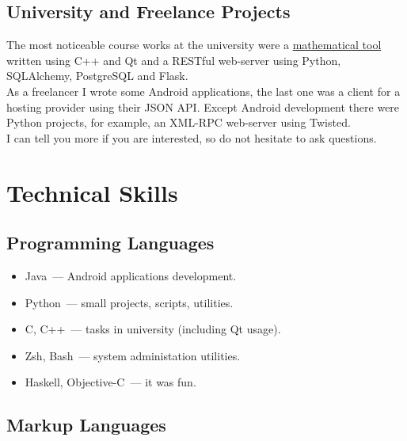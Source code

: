     \subsection*{University and Freelance Projects}

      The most noticeable course works at the university were
      a \href{https://github.com/ming13/aequation}{mathematical tool} written
      using C++ and Qt and a RESTful web-server using Python,
      SQLAlchemy, PostgreSQL and Flask. \\

      As a freelancer I wrote some Android applications, the last one was
      a client for a hosting provider using their JSON API. Except Android
      development there were Python projects, for example, an XML-RPC
      web-server using Twisted. \\

      I can tell you more if you are interested, so do not hesitate to ask
      questions.

  \section*{Technical Skills}

    \subsection*{Programming Languages}

      \begin{itemize}

        \item Java~--- Android applications development.

        \item Python~--- small projects, scripts, utilities.

        \item C, C++~--- tasks in university (including Qt usage).

        \item Zsh, Bash~--- system administation utilities.

        \item Haskell, Objective-C~--- it was fun.

      \end{itemize}

    \subsection*{Markup Languages}

